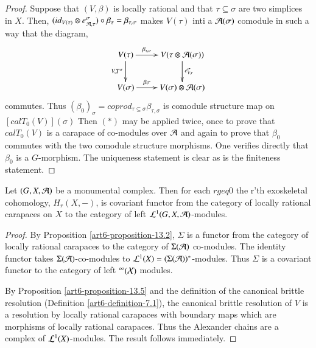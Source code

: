 \begin{proof}
Suppose that $(V, \beta)$ is locally rational and that $\tau \subseteq \sigma$ are two simplices in $X$. Then, $(id_{V(\tau)}\otimes e_{\mathcal{A}, \tau}^{\sigma})\circ \beta_{\tau}= \beta_{\tau, \sigma}$ makes $V(\tau)$ inti a $\mathcal{A}(\sigma)$ comodule in such a way that  the diagram,
\begin{equation*}
\vcenter{
\xymatrix{
V(\tau)\ar[d]_-{V, T^{\sigma}}\ar[r]^-{\beta_{\tau, \sigma}} & V(\tau \otimes \calA(\sigma))\ar[d]^-{e_{V, \tau}^{\sigma}}\\
V(\sigma)\ar[r]^-{\beta \sigma}& V(\sigma)\otimes \calA(\sigma)
}}
\end{equation*}
commutes. Thus $(\beta_{0})_{\sigma} = coprod_{\tau \subseteq \sigma} \beta_{\tau, \sigma}$ is comodule structure map on $[calT_{0}(V)](\sigma)$ Then $(*)$ may be applied twice, once to prove that $calT_{0}(V)$ is a carapace of co-modules over $\mathcal{A}$ and again to prove that $\beta_{0}$ commutes with the two comodule structure morphisms. One verifies directly that $\beta_{0}$ is a $G$-morphism. The uniqueness statement is clear as is the finiteness statement.
\end{proof}

\begin{prop}\label{art6-proposition-13.6}
Let $(G, X, \mathcal{A})$ be a monumental complex. Then for each $r geq 0$ the r'th exoskeletal cohomology, $H_{r}(X, -)$, is covariant functor from the category of locally rational carapaces on $X$ to the category of left $\mathcal{L}^{1}(G, X, \mathcal{A})$-modules. 
\end{prop}

\begin{proof}
By Proposition \ref{art6-proposition-13.2}, $\Sigma$ is a functor from the category of locally rational carapaces to the category of $\Sigma(\mathcal{A})$ co-modules. The identity functor takes $\Sigma(\mathcal{A})$-co-modules to
$\mathcal{L}^{1}(X)= (\Sigma(\mathcal{A}))^{*}$-modules. Thus $\Sigma$ is a covariant functor to the category of left $\cal^{1}(X)$ modules.

By Proposition \ref{art6-proposition-13.5} and the definition of the canonical brittle resolution (Definition \ref{art6-definition-7.1}), the canonical brittle resolution of $V$ is a resolution by locally rational carapaces with boundary maps which are morphisms of locally rational carapaces. Thus the Alexander chains are a complex of $\mathcal{L}^{1}(X)$-modules. The result follows immediately. 
\end{proof}

